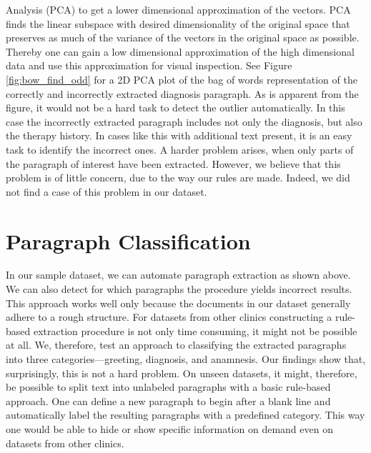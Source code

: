 Analysis (PCA) to get a lower dimensional approximation of the vectors. PCA finds the linear
subspace with desired dimensionality of the original space that preserves as much of the variance of the vectors in the original space as possible. Thereby one can gain a low dimensional approximation of the high dimensional data and use this approximation for visual inspection.
See Figure \ref{fig:bow_find_odd} for a 2D PCA plot of the bag of words representation
of the correctly and incorrectly extracted diagnosis paragraph. As is apparent from the figure, it would not be a
hard task to detect the outlier automatically. In this case the incorrectly
extracted paragraph includes not only the diagnosis, but also the
therapy history. In cases like this with additional text present, it is an easy task to
identify the incorrect ones. A harder problem arises, when only parts
of the paragraph of interest have been extracted. However, we believe
that this problem is of little concern, due to the way our rules are made.
Indeed, we did not find a case
of this problem in our dataset. %





\section{Paragraph Classification}
In our sample dataset, we can automate paragraph extraction as shown above. We can also detect for which paragraphs the procedure yields incorrect results. This approach works well only because the documents in our dataset generally adhere to a rough structure. For datasets from other clinics constructing a rule-based extraction procedure is not only time consuming, it might not be possible at all. We, therefore, test an approach to classifying the extracted paragraphs into three categories---greeting, diagnosis, and anamnesis. Our findings show that, surprisingly, this is not a hard problem. On unseen datasets, it might, therefore, be possible to split text into unlabeled paragraphs with a basic rule-based approach. One can define a new paragraph to begin after a blank line and automatically label the resulting paragraphs with a predefined category. This way one would be able to hide or show specific information on demand even on datasets from other clinics.

